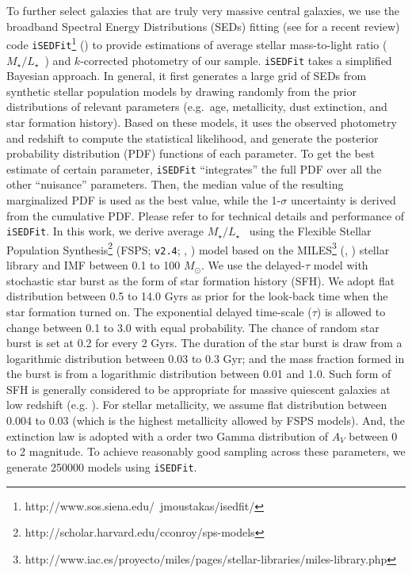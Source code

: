 \documentclass[preprint]{aastex}
\def\msun{$M_\odot$}
\def\m2l{{$M_{\star}/L_{\star}$}~}
\begin{document}
\begin{CJK*}{UTF8}{gbsn}
    To further select galaxies that are truly very massive central galaxies, we use 
    the broadband Spectral Energy Distributions (SEDs) fitting (see 
    \citealt{Walcher2011} for a recent review) code 
    \texttt{iSEDFit}\footnote{http://www.sos.siena.edu/~jmoustakas/isedfit/} 
    (\citealt{Moustakas2013}) to provide estimations of average stellar 
    mass-to-light ratio (\m2l) and $k$-corrected photometry of our 
    sample. 
    \texttt{iSEDFit} takes a simplified Bayesian approach. 
    In general, it first generates a large grid of SEDs from synthetic stellar 
    population models by drawing randomly from the prior distributions of relevant 
    parameters (e.g.\ age, metallicity, dust extinction, and star formation history).
    Based on these models, it uses the observed photometry and redshift to 
    compute the statistical likelihood, and generate the posterior probability 
    distribution (PDF) functions of each parameter.  
    To get the best estimate of certain parameter, \texttt{iSEDFit} ``integrates'' 
    the full PDF over all the other ``nuisance'' parameters.
    Then, the median value of the resulting marginalized PDF is used as the best
    value, while the 1-$\sigma$ uncertainty is derived from the cumulative PDF.
    Please refer to \citet{Moustakas2013} for technical details and performance of     
    \texttt{iSEDFit}. 
    In this work, we derive average \m2l using the Flexible Stellar Population 
    Synthesis\footnote{http://scholar.harvard.edu/cconroy/sps-models}
    (FSPS; \texttt{v2.4}; \citealt{FSPS}, \citealt{Conroy2010}) model based on 
    the MILES\footnote{http://www.iac.es/proyecto/miles/pages/stellar-libraries/miles-library.php}
    (\citealt{MILES1}, \citealt{MILES2}) stellar library and \citet{Chabrier2003} 
    IMF between 0.1 to 100 \msun. 
    We use the delayed-$\tau$ model with stochastic star burst as the form of 
    star formation history (SFH).  
    We adopt flat distribution between 0.5 to 14.0 Gyrs as prior for the look-back 
    time when the star formation turned on. 
    The exponential delayed time-scale ($\tau$) is allowed to change between 
    0.1 to 3.0 with equal probability.  
    The chance of random star burst is set at 0.2 for every 2 Gyrs. 
    The duration of the star burst is draw from a logarithmic distribution 
    between 0.03 to 0.3 Gyr; and the mass fraction formed in the burst is from 
    a logarithmic distribution between 0.01 and 1.0.  
    Such form of SFH is generally considered to be appropriate for massive 
    quiescent galaxies at low redshift (e.g. \citealt{Kauffmann2003}). 
    For stellar metallicity, we assume flat distribution between 0.004 to 
    0.03 (which is the highest metallicity allowed by FSPS models).  
    And, the \citet{Calzetti2000} extinction law is adopted with a order two 
    Gamma distribution of $A_{V}$ between 0 to 2 magnitude.  
    To achieve reasonably good sampling across these parameters, we generate 
    250000 models using \texttt{iSEDFit}. 
    

\end{CJK*}
\end{document}
